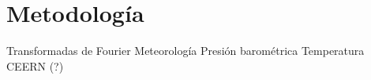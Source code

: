 \section{Metodología}

Transformadas de Fourier
Meteorología
   Presión barométrica
   Temperatura
CEERN (?)
